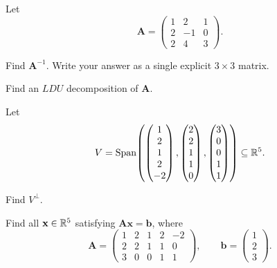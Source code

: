 \documentclass[11pt,oneside]{article}
\begin{document}
\begin{problem}
Let
\[
\mathbf A=
\begin{pmatrix}
1&2&1\\
2&-1&0\\
2&4&3
\end{pmatrix}.
\]
\begin{problemsubparts}
\item Find $\mathbf A^{-1}$. Write your answer as a single explicit $3\times3$ matrix.
\item Find an $LDU$ decomposition of $\mathbf A$.
\end{problemsubparts}
\end{problem}

\begin{problem}
Let
\[
V=\operatorname{Span}\!\left(
\begin{pmatrix}1\\2\\1\\2\\-2\end{pmatrix},
\begin{pmatrix}2\\2\\1\\1\\0\end{pmatrix},
\begin{pmatrix}3\\0\\0\\1\\1\end{pmatrix}
\right)\subseteq\mathbb{R}^5.
\]
\begin{problemsubparts}
\item Find $V^\perp$.
\item Find all $\mathbf x\in\mathbb{R}^5$ satisfying $\mathbf A\mathbf x=\mathbf b$, where
\[
\mathbf A=
\begin{pmatrix}
1&2&1&2&-2\\
2&2&1&1&0\\
3&0&0&1&1
\end{pmatrix},
\qquad
\mathbf b=
\begin{pmatrix}
1\\2\\3
\end{pmatrix}.
\]
\end{problemsubparts}
\end{problem}
\end{document}
